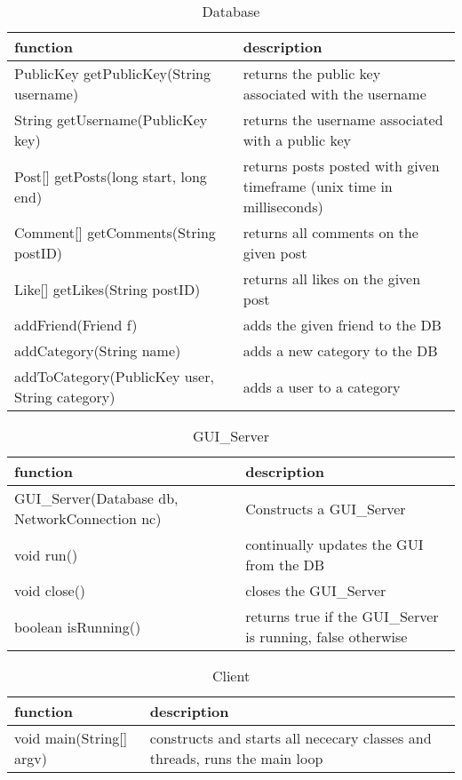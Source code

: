 \begin{table}[h]
    \centering
    \begin{tabular}{ll}
    function                                & description\\ \hline
    PublicKey getPublicKey(String username) & returns the public key associated with the username\\
    String getUsername(PublicKey key)       & returns the username associated with a public key\\    
    Post[] getPosts(long start, long end)   & returns posts posted with given timeframe (unix time in milliseconds)\\
    Comment[] getComments(String postID)    & returns all comments on the given post\\
    Like[] getLikes(String postID)          & returns all likes on the given post\\
    addFriend(Friend f)                     & adds the given friend to the DB\\
    addCategory(String name)                & adds a new category to the DB\\
    addToCategory(PublicKey user, String category) & adds a user to a category\\
    \end{tabular}
    \caption{Database}
\end{table}

\begin{table}[h]
    \centering
    \begin{tabular}{ll}
    function                                       & description\\ \hline
    GUI\_Server(Database db, NetworkConnection nc) & Constructs a GUI\_Server\\
    void run()                                     & continually updates the GUI from the DB\\
    void close()                                   & closes the GUI\_Server\\
    boolean isRunning()                            & returns true if the GUI\_Server is running, false otherwise\\
    \end{tabular}
    \caption{GUI\_Server}
\end{table}

\begin{table}[h]
    \centering
    \begin{tabular}{ll}
    function                 & description\\ \hline
    void main(String[] argv) & constructs and starts all nececary classes and threads, runs the main loop\\
    \end{tabular}
    \caption{Client}
\end{table}

